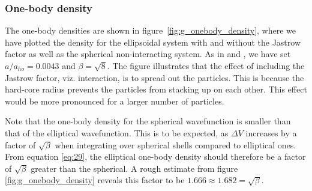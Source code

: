\documentclass[
    a4paper, aps, twocolumn, floatfix, superscriptaddress,
    nofootinbib]{revtex4-1}
\begin{document}
\subsubsection{One-body density}
The one-body densities are shown in figure~\ref{fig:g_onebody_density}, where we have plotted the density for the ellipsoidal system with and without the Jastrow factor as well as the spherical non-interacting system. As in \cite{vortex} and \cite{trapped}, we have set $a/a_{ho} = 0.0043$ and $\beta = \sqrt{8}$. The figure illustrates that the effect of including the Jastrow factor, viz. interaction, is to spread out the particles. This is because the hard-core radius prevents the particles from stacking up on each other. This effect would be more pronounced for a larger number of particles. 

Note that the one-body density for the spherical wavefunction is smaller than that of the elliptical wavefunction. This is to be expected, as $\Delta V$ increases by a factor of $\sqrt{\beta}$ when integrating over spherical shells compared to elliptical ones. From equation \eqref{eq:29}, the elliptical one-body density should therefore be a factor of $\sqrt{\beta}$ greater than the spherical. A rough estimate from figure \ref{fig:g_onebody_density} reveals this factor to be $1.666 \approx 1.682 = \sqrt{\beta}$.
\end{document}
